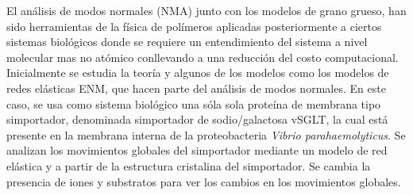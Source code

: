 
El an\'{a}lisis de modos normales (NMA) junto con los modelos de grano grueso, han sido herramientas de la f\'{i}sica de pol\'{i}meros aplicadas posteriormente a ciertos sistemas biol\'{o}gicos donde se requiere un entendimiento del sistema a nivel molecular mas no at\'{o}mico conllevando a una  reducci\'{o}n del costo computacional. Inicialmente se estudia la teor\'{i}a y algunos de los modelos como los modelos de redes el\'{a}sticas ENM, que hacen parte del an\'{a}lisis de modos normales. En este caso, se usa como sistema biol\'{o}gico una s\'{o}la sola prote\'{i}na de membrana tipo simportador, denominada simportador de sodio/galactosa vSGLT, la cual est\'{a} presente en la membrana interna de la proteobacteria \textit{Vibrio parahaemolyticus}. Se analizan los movimientos globales del simportador mediante un modelo de red el\'{a}stica y a partir de la estructura cristalina del simportador. Se cambia la presencia de iones y substratos para ver los cambios en los movimientos globales.\\

